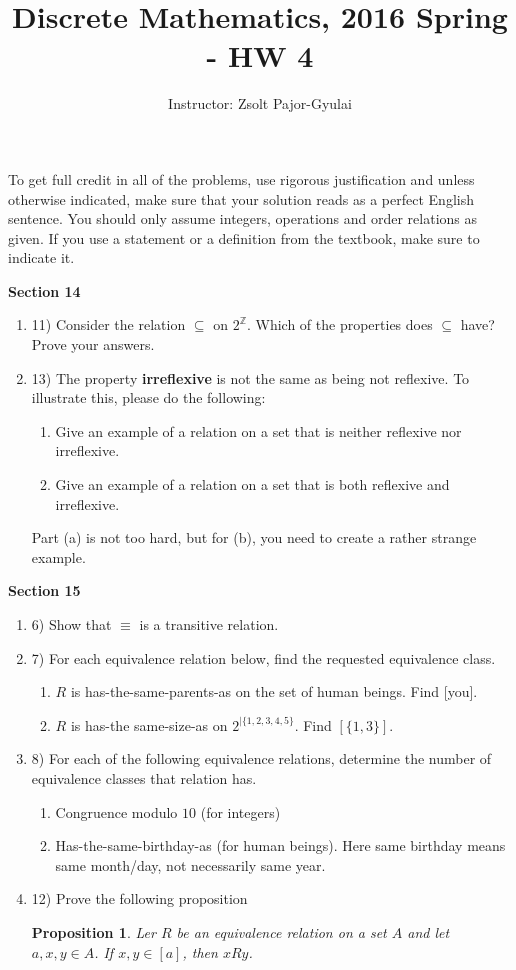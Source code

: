 \documentclass[11pt]{preprint}
\title{Discrete Mathematics, 2016 Spring - HW 4}
\author{Instructor: Zsolt Pajor-Gyulai}
\institute{Courant Institute of Mathematical Sciences, NYU}
\newtheorem{proposition}{Proposition}
\def\enumb{\begin{enumerate}}
\def\enume{\end{enumerate}}
\begin{document}
\maketitle

To get full credit  in all of the problems, use rigorous justification and unless otherwise indicated, make sure that your solution reads as a perfect English sentence. You should only assume integers, operations and order relations as given. If you use a statement or a definition from the textbook, make sure to indicate it.
\vspace{0.2cm}

\textbf{Section 14}
\enumb
\item[11)] Consider the relation $\subseteq$ on $2^{\mathbb{Z}}$. Which of the properties does $\subseteq$ have? Prove your answers.

\item[13)] The property \textbf{irreflexive} is not the same as being not reflexive. To illustrate this, please do the following:
\enumb
\item Give an example of a relation on a set that is neither reflexive nor irreflexive.
\item Give an example of a relation on a set that is both reflexive and irreflexive.
\enume
Part (a) is not too hard, but for (b), you need to create a rather strange example.


\enume

\textbf{Section 15}
\enumb
\item[6)] Show that $\equiv$ is a transitive relation.

\item[7)] For each equivalence relation below, find the requested equivalence class.
\enumb
\item $R$ is has-the-same-parents-as on the set of human beings. Find [you].
\item $R$ is has-the same-size-as on $2^{|\{1,2,3,4,5\}}$. Find $[\{1,3\}]$.
\enume
\item[8)] For each of the following equivalence relations, determine the number of equivalence classes that relation has.
\enumb
\item Congruence modulo $10$ (for integers)
\item Has-the-same-birthday-as (for human beings). Here same birthday means same month/day, not necessarily same year.
\enume
\item[12)] Prove the following proposition
\begin{proposition}
Ler $R$ be an equivalence relation on a set $A$ and let $a,x,y\in A$. If $x,y\in[a]$, then $x R y$.
\end{proposition}
\enume
\end{document}
